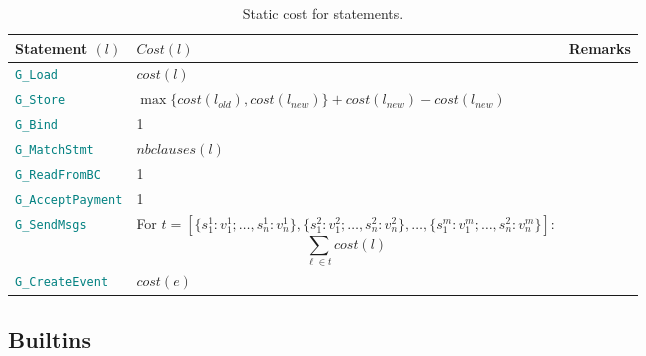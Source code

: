 \documentclass[9pt]{article}
\begin{document}
\begin{table}[!hbt]
	\caption{Static cost for statements. \label{tab:statements} }
\centering
	\begin{tabular}{|l|p{8cm}|p{3cm}|}
	\hline
		\textbf{Statement $(l)$} & \textbf{$Cost(l)$} & \textbf{Remarks} \\ \hline
		\texttt{\textcolor{teal}{G\_Load}}  & $cost(l)$  & \\ \hline
		\texttt{\textcolor{teal}{G\_Store}}  & $\max\{cost(l_{old}),
		cost(l_{new})\} + cost(l_{new}) -
		cost(l_{new})$  & \\ \hline
		\texttt{\textcolor{teal}{G\_Bind}}  & 1 & \\ \hline
		\texttt{\textcolor{teal}{G\_MatchStmt}}  & $nbclauses(l)$  & \\ \hline
		\texttt{\textcolor{teal}{G\_ReadFromBC}}  & 1  & \\ \hline
		\texttt{\textcolor{teal}{G\_AcceptPayment}}  & 1  & \\ \hline
		\texttt{\textcolor{teal}{G\_SendMsgs}}  & For $t = [\{s_{1}^{1} :
		v_{1}^{1}; \ldots, s_n^1 : v_n^1\}, \{s_1^2 : v_1^2; \ldots, s_n^2 :
		v_n^2\}, \ldots, \{s_1^m : v_1^m; \ldots, s_n^2 : v_n^m\}] $: $$
		\sum_{\ell \in t} cost(l) $$ & \\ \hline
		\texttt{\textcolor{teal}{G\_CreateEvent}}  & $cost(e)$ & \\ \hline
	\end{tabular}
\end{table}


\subsection{Builtins}
\end{document}
